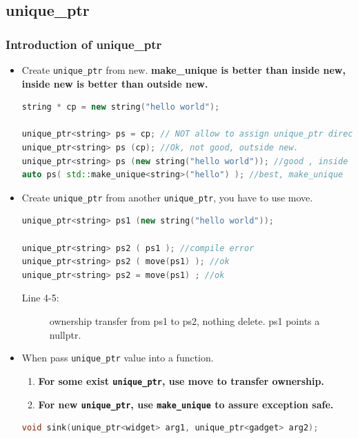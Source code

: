 \documentclass[a4paper,11pt,twoside]{book}
\begin{document}
\subsection{unique\_ptr}

\subsubsection{Introduction of unique\_ptr}
\begin{itemize}

\item Create \texttt{unique\_ptr} from new. \textbf{make\_unique is better than inside new, inside new is better than outside new.}
\begin{lstlisting}[frame=single, language=c++]
string * cp = new string("hello world");

unique_ptr<string> ps = cp; // NOT allow to assign unique_ptr directly.
unique_ptr<string> ps (cp); //Ok, not good, outside new.
unique_ptr<string> ps (new string("hello world")); //good , inside new
auto ps( std::make_unique<string>("hello") ); //best, make_unique 
\end{lstlisting}

\item Create \texttt{unique\_ptr} from another \texttt{unique\_ptr}, you have to use move.
\begin{lstlisting}[frame=single, language=c++]
unique_ptr<string> ps1 (new string("hello world"));

unique_ptr<string> ps2 ( ps1 ); //compile error
unique_ptr<string> ps2 ( move(ps1) ); //ok
unique_ptr<string> ps2 = move(ps1) ; //ok
\end{lstlisting}
\begin{description}
	\item[Line 4-5:] ownership transfer from ps1 to ps2, nothing delete. ps1 points a nullptr.
\end{description}

\item When pass \texttt{unique\_ptr} value into a function.
\begin{enumerate}
	\item \textbf{For some exist \texttt{unique\_ptr}, use move to transfer ownership.}
	\item \textbf{For new \texttt{unique\_ptr}, use \texttt{make\_unique} to assure exception safe.}	
\end{enumerate}

\begin{lstlisting}[frame=single, language=c++]
void sink(unique_ptr<widget> arg1, unique_ptr<gadget> arg2);


\end{lstlisting}
\end{itemize}
\end{document}
